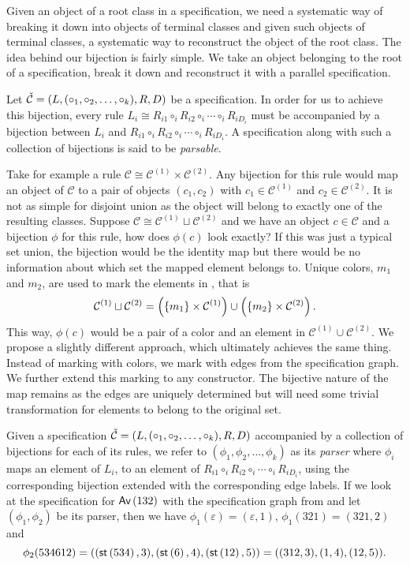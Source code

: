 \label{ch:pbijection}

Given an object of a root class in a specification, we need a systematic way of breaking it down into objects of terminal classes and given such objects of terminal classes, a systematic way to reconstruct the object of the root class. The idea behind our bijection is fairly simple. We take an object belonging to the root of a specification, break it down and reconstruct it with a parallel specification.

Let $\check{\mathcal{C}} = (L,(\circ_1,\circ_2,\dotsc,\circ_k),R,D)$ be a specification. In order for us to achieve this bijection, every rule $L_i \cong R_{i1} \circ_i R_{i2} \circ_i \dotsm \circ_i R_{iD_i}$ must be accompanied by a bijection between $L_i$ and $R_{i1} \circ_i R_{i2} \circ_i \dotsm \circ_i R_{iD_i}$. A specification along with such a collection of bijections is said to be \emph{parsable}.

Take for example a rule $\mathcal{C} \cong \mathcal{C}^{(1)} \times \mathcal{C}^{(2)}$. Any bijection for this rule would map an object of $\mathcal{C}$ to a pair of objects $(c_1,c_2)$ with $c_1 \in \mathcal{C}^{(1)}$ and $c_2 \in \mathcal{C}^{(2)}$. It is not as simple for disjoint union as the object will belong to exactly one of the resulting classes. Suppose $\mathcal{C} \cong \mathcal{C}^{(1)} \sqcup \mathcal{C}^{(2)}$ and we have an object $c\in\mathcal{C}$ and a bijection $\phi$ for this rule, how does $\phi(c)$ look exactly? If this was just a typical set union, the bijection would be the identity map but there would be no information about which set the mapped element belongs to. Unique colors, $m_1$ and $m_2$, are used to mark the elements in , that is
\[
    \mathcal{C}^{(1)} \sqcup \mathcal{C}^{(2)} = \left(\left\{m_1\right\} \times \mathcal{C}^{(1)}\right) \cup \left(\left\{m_2\right\} \times \mathcal{C}^{(2)}\right).
\]
This way, $\phi(c)$ would be a pair of a color and an element in $\mathcal{C}^{(1)} \cup \mathcal{C}^{(2)}$. We propose a slightly different approach, which ultimately achieves the same thing. Instead of marking with colors, we mark with edges from the specification graph. We further extend this marking to any constructor. The bijective nature of the map remains as the edges are uniquely determined but will need some trivial transformation for elements to belong to the original set.

Given a specification $\check{\mathcal{C}} = (L,(\circ_1,\circ_2,\dotsc,\circ_k),R,D)$ accompanied by a collection of bijections for each of its rules, we refer to $(\phi_1,\phi_2,\dotsc,\phi_k)$ as its \emph{parser} where $\phi_i$ maps an element of $L_i$, to an element of $R_{i1} \circ_i R_{i2} \circ_i \dotsm \circ_i R_{iD_i}$, using the corresponding bijection extended with the corresponding edge labels. If we look at the specification for $\textsf{Av}\left(132\right)$ with the specification graph from  and let $(\phi_1,\phi_2)$ be its parser, then we have $\phi_1(\varepsilon) = (\varepsilon, 1)$, $\phi_1(321) = (321, 2)$ and 
\[
    \phi_2(534612) = ((\textsf{st}\left(534\right),3), (\textsf{st}\left(6\right),4), (\textsf{st}\left(12\right),5)) = ((312,3), (1,4), (12,5)).
\]

